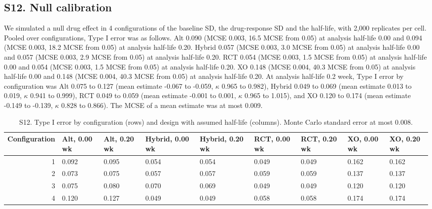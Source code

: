 \documentclass[
  11pt,
]{article}
\begin{document}
\subsection{S12. Null calibration}\label{s12.-null-calibration}

We simulated a null drug effect in 4 configurations of the baseline SD, the drug-response SD and the half-life, with 2,000 replicates per cell. Pooled over configurations, Type I error was as follows. Alt 0.090 (MCSE 0.003, 16.5 MCSE from 0.05) at analysis half-life 0.00 and 0.094 (MCSE 0.003, 18.2 MCSE from 0.05) at analysis half-life 0.20. Hybrid 0.057 (MCSE 0.003, 3.0 MCSE from 0.05) at analysis half-life 0.00 and 0.057 (MCSE 0.003, 2.9 MCSE from 0.05) at analysis half-life 0.20. RCT 0.054 (MCSE 0.003, 1.5 MCSE from 0.05) at analysis half-life 0.00 and 0.054 (MCSE 0.003, 1.5 MCSE from 0.05) at analysis half-life 0.20. XO 0.148 (MCSE 0.004, 40.3 MCSE from 0.05) at analysis half-life 0.00 and 0.148 (MCSE 0.004, 40.3 MCSE from 0.05) at analysis half-life 0.20. At analysis half-life 0.2 week, Type I error by configuration was Alt 0.075 to 0.127 (mean estimate -0.067 to -0.059, \(\kappa\) 0.965 to 0.982), Hybrid 0.049 to 0.069 (mean estimate 0.013 to 0.019, \(\kappa\) 0.941 to 0.999), RCT 0.049 to 0.059 (mean estimate -0.001 to 0.001, \(\kappa\) 0.965 to 1.015), and XO 0.120 to 0.174 (mean estimate -0.149 to -0.139, \(\kappa\) 0.828 to 0.866). The MCSE of a mean estimate was at most 0.009.

\begin{table}
\centering
\caption{\label{tab:s12-tab}S12. Type I error by configuration (rows) and design with assumed half-life (columns). Monte Carlo standard error at most 0.008.}
\centering
\fontsize{7}{9}\selectfont
\begin{tabular}[t]{rllllllll}
\toprule
Configuration & Alt, 0.00 wk & Alt, 0.20 wk & Hybrid, 0.00 wk & Hybrid, 0.20 wk & RCT, 0.00 wk & RCT, 0.20 wk & XO, 0.00 wk & XO, 0.20 wk\\
\midrule
1 & 0.092 & 0.095 & 0.054 & 0.054 & 0.049 & 0.049 & 0.162 & 0.162\\
2 & 0.073 & 0.075 & 0.057 & 0.057 & 0.059 & 0.059 & 0.137 & 0.137\\
3 & 0.075 & 0.080 & 0.070 & 0.069 & 0.049 & 0.049 & 0.120 & 0.120\\
4 & 0.120 & 0.127 & 0.049 & 0.049 & 0.058 & 0.058 & 0.174 & 0.174\\
\bottomrule
\end{tabular}
\end{table}
\end{document}

